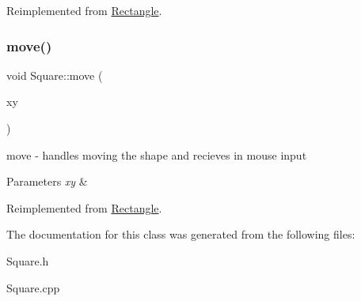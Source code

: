 Reimplemented from \hyperlink{class_rectangle_ade126ee824e394b9c38d2e67a30d1a7d}{Rectangle}.

\mbox{\label{class_square_a49d1e790212e18cb43d7647385cafa20}} 
\subsubsection{\texorpdfstring{move()}{move()}}
{\footnotesize\ttfamily void Square\+::move (\begin{DoxyParamCaption}\item[{Q\+Point}]{xy }\end{DoxyParamCaption})\hspace{0.3cm}{\ttfamily [virtual]}}



move -\/ handles moving the shape and recieves in mouse input 


\begin{DoxyParams}{Parameters}
{\em xy} & \\
\hline
\end{DoxyParams}


Reimplemented from \hyperlink{class_rectangle_abeeafbc4d44bf241cf655e850f3ce3f3}{Rectangle}.



The documentation for this class was generated from the following files\+:\begin{DoxyCompactItemize}
\item 
Square.\+h\item 
Square.\+cpp\end{DoxyCompactItemize}
